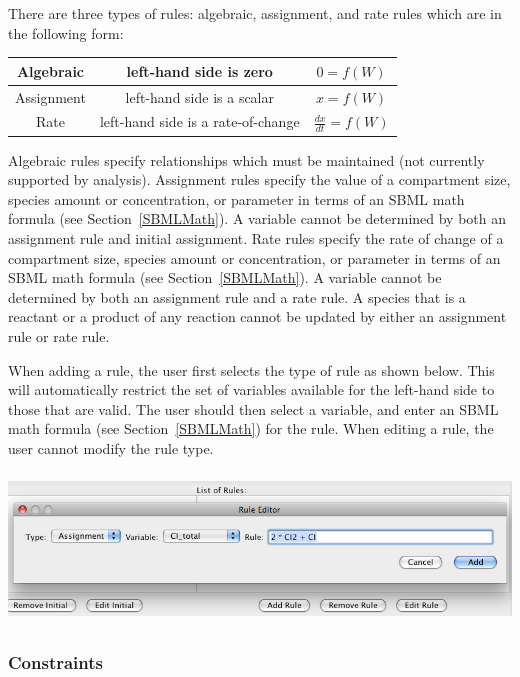 \documentclass[titlepage,11pt]{article}
\begin{document}
\noindent
There are three types of rules: algebraic, assignment, and rate rules
which are in the following form:
\begin{center}
\begin{tabular}{|c|c|c|}
\hline
Algebraic  & left-hand side is zero             & $0 = f(W)$ \\ \hline
Assignment & left-hand side is a scalar         & $x = f(W)$ \\ \hline
Rate       & left-hand side is a rate-of-change & $\frac{dx}{dt} = f(W)$ 
\\ \hline
\end{tabular}
\end{center}
Algebraic rules specify relationships which must be maintained 
(not currently supported by analysis).  Assignment rules specify 
the value of a compartment size, species amount or concentration, or
parameter in terms of an SBML math formula (see
Section~\ref{SBMLMath}).  A variable cannot be determined by
both an assignment rule and initial assignment.  Rate rules specify
the rate of change of a compartment size, species amount or
concentration, or parameter in terms of an SBML math formula
(see Section~\ref{SBMLMath}).  A variable cannot be determined 
by both an assignment rule and a rate rule.  A species that is 
a reactant or a product of any reaction cannot be updated by either
an assignment rule or rate rule.

When adding a rule, the user first selects the type of rule as shown
below.  This
will automatically restrict the set of variables available for the 
left-hand side to those that are valid.  The user should then select
a variable, and enter an SBML math formula (see Section~\ref{SBMLMath})
for the rule.  When editing a rule, the user cannot modify the rule type. 
\begin{center}
\includegraphics[height=40mm]{screenshots/rule}
\end{center}

\subsubsection{\label{constraints}Constraints}
\end{document}
